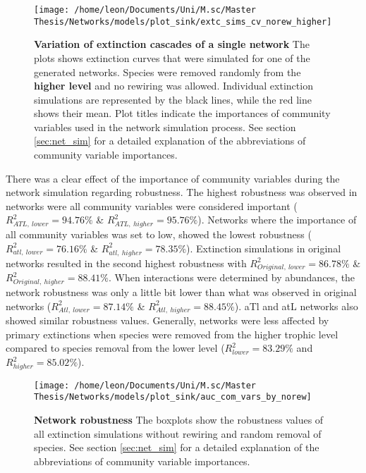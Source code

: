 \documentclass[12pt,a4paper]{article}
\begin{document}
\begin{figure}[H]
	 \centering
	 \texttt{[image: /home/leon/Documents/Uni/M.sc/Master Thesis/Networks/models/plot\_sink/extc\_sims\_cv\_norew\_higher]}
	 \captionsetup{width = \textwidth}
	 \caption{\textbf{Variation of extinction cascades of a single network} The plots shows extinction curves that were simulated for one of the generated networks. Species were removed randomly from the \textbf{higher level} and no rewiring was allowed. Individual extinction simulations are represented by the black lines, while the red line shows their mean. Plot titles indicate the importances of community variables used in the network simulation process. See section \ref{sec:net_sim} for a detailed explanation of the abbreviations of community variable importances.}
	 \label{fig:extc_cv_norew_higher}
\end{figure}

There was a clear effect of the importance of community variables during the network simulation regarding robustness. The highest robustness was observed in networks were all community variables were considered important ($R^2_{ATL,\: lower} = 94.76\%$ \& $R^2_{ATL,\: higher} = 95.76\%$). Networks where the importance of all community variables was set to low, showed the lowest robustness ($R^2_{atl,\: lower} = 76.16\%$ \& $R^2_{atl,\: higher} = 78.35\%$). Extinction simulations in original networks resulted in the second highest robustness with $R^2_{Original,\: lower} = 86.78\%$ \& $R^2_{Original,\: higher} = 88.41\%$. When interactions were determined by abundances, the network robustness was only a little bit lower than what was observed in original networks ($R^2_{Atl,\: lower} = 87.14\%$ \& $R^2_{Atl,\: higher} = 88.45\%$). aTl and atL networks also showed similar robustness values.  Generally, networks were less affected by primary extinctions when species were removed from the higher trophic level compared to species removal from the lower level ($R^2_{lower} = 83.29\% $ and $R^2_{higher} = 85.02\%$). \par


\begin{figure}[H]
	 \centering
	 \texttt{[image: /home/leon/Documents/Uni/M.sc/Master Thesis/Networks/models/plot\_sink/auc\_com\_vars\_by\_norew]}
	 \captionsetup{width = .8\textwidth}
	 \caption{\textbf{Network robustness } The boxplots show the robustness values of all extinction simulations without rewiring and random removal of species. See section \ref{sec:net_sim} for a detailed explanation of the abbreviations of community variable importances.}
	 \label{fig:auc_cv_norew}
\end{figure}
\end{document}

